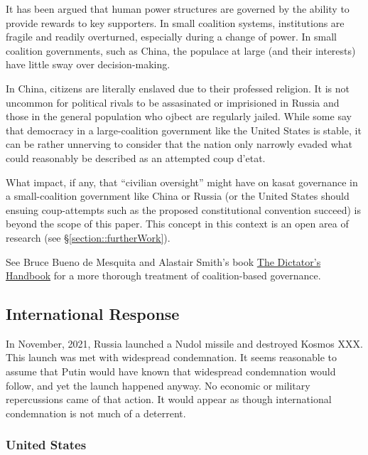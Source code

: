It has been argued that human power structures are governed by the
ability to provide rewards to key supporters.\cite[ch1]{dictator} In
small coalition systems, institutions are fragile and readily
overturned, especially during a change of power.\cite[ch2]{dictator}
In small coalition governments, such as China, the populace at large
(and their interests) have little sway over
decision-making.\cite[ch1]{dictator}

In China, citizens are literally enslaved due to their professed
religion.\cite{uyghurs} It is not uncommon for political rivals to be
assasinated\cite{polonium} or imprisioned\cite{navalny} in Russia and
those in the general population who ojbect are regularly
jailed.\cite{protestors-jailed} While some say that democracy in a
large-coalition government like the United States is
stable\cite[ch10]{dictator}, it can be rather unnerving to consider
that the nation only narrowly evaded what could reasonably be
described as an attempted coup
d'etat.\cite{coup-coup-clock}\cite{coup-coup-click}

What impact, if any, that ``civilian oversight'' might have on
\ac{kasat} governance in a small-coalition government like China or
Russia (or the United States should ensuing coup-attempts such as the
proposed constitutional convention succeed) is beyond the scope of
this paper.  This concept in this context is an open area of research
(see \S\ref{section::furtherWork}).

See Bruce Bueno de Mesquita and Alastair Smith's book
\href{https://www.publicaffairsbooks.com/titles/bruce-bueno-de-mesquita/the-dictators-handbook/9781541701366/}{The
  Dictator's Handbook} for a more thorough treatment of
coalition-based governance.

\subsection{International Response}

In November, 2021, Russia launched a Nudol missile and destroyed
Kosmos XXX.\cite[nudol]{xxx} This launch was met with widespread
condemnation.\cite[nytimes nudol response]{xxx} It seems reasonable to
assume that Putin would have known that widespread condemnation would
follow, and yet the launch happened anyway.  No economic or military
repercussions came of that action.  It would appear as though
international condemnation is not much of a deterrent.

\subsubsection{United States}

